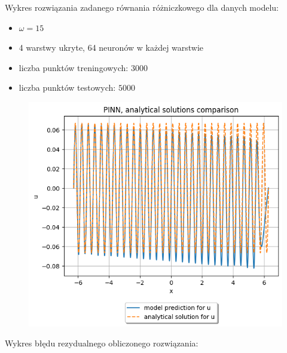 \documentclass{article}
\begin{document}
Wykres rozwiązania zadanego równania różniczkowego dla danych modelu:\\
\begin{itemize}
  \item $\omega = 15$\\
  \item 4 warstwy ukryte, 64 neuronów w każdej warstwie\\
  \item liczba punktów treningowych: $3000$\\
  \item liczba punktów testowych: $5000$
\end{itemize}

\begin{figure}[H]
  \includegraphics[width=\linewidth]{figures/3.png}
\end{figure}

Wykres błędu rezydualnego obliczonego rozwiązania:\\
\end{document}
